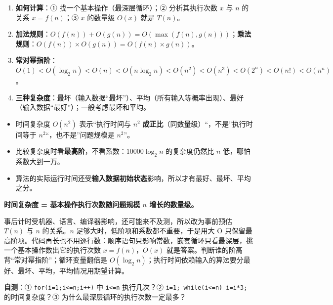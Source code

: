 \documentclass[10.5pt,a4paper,oneside]{article}
\providecommand{\tightlist}{\setlength{\itemsep}{2pt}\setlength{\parskip}{0pt}}
\begin{document}
\begin{exambox}

\begin{enumerate}
\def\labelenumi{\arabic{enumi}.}
\tightlist
\item
  \textbf{如何计算}：① 找一个基本操作（最深层循环）；② 分析其执行次数
  \(x\) 与 \(n\) 的关系 \(x=f(n)\)；③ \(x\) 的数量级 \(O(x)\) 就是
  \(T(n)\)。
\item
  \textbf{加法规则}：\(O(f(n))+O(g(n))=O(\max(f(n),g(n)))\)；\textbf{乘法规则}：\(O(f(n))\times O(g(n))=O(f(n)\times g(n))\)。
\item
  \textbf{常对幂指阶}：\(O(1)<O(\log_2 n)<O(n)<O(n\log_2 n)<O(n^2)<O(n^3)<O(2^n)<O(n!)<O(n^n)\)。
\item
  \textbf{三种复杂度}：最坏（输入数据“最坏”）、平均（所有输入等概率出现）、最好（输入数据“最好”）；一般考虑最坏和平均。
\end{enumerate}

\end{exambox}

\begin{pitfallbox}

\begin{itemize}
\tightlist
\item
  时间复杂度 \(O(n^2)\) 表示“执行时间与 \(n^2\)
  \textbf{成正比}（同数量级）“，不是”执行时间等于
  \(n^2\)“，也不是”问题规模是 \(n^2\)”。
\item
  比较复杂度时看\textbf{最高阶}，不看系数：\(10000\log_2 n\)
  的复杂度仍然比 \(n\) 低，哪怕系数大到一万。
\item
  算法的实际运行时间还受\textbf{输入数据初始状态}影响，所以才有最好、最坏、平均之分。
\end{itemize}

\end{pitfallbox}

\begin{summarybox}

\textbf{时间复杂度 = 基本操作执行次数随问题规模 \(n\) 增长的数量级。}

事后计时受机器、语言、编译器影响，还可能来不及测，所以改为事前预估
\(T(n)\) 与 \(n\) 的关系。\(n\) 足够大时，低阶项和系数都不重要，于是用大
O
只保留最高阶项。代码再长也不用逐行数：顺序语句只影响常数，嵌套循环只看最深层，挑一个基本操作数出它的执行次数
\(x=f(n)\)，\(O(x)\)
就是答案。判断谁的阶高背“常对幂指阶”；循环变量翻倍是
\(O(\log_2 n)\)；执行时间依赖输入的算法要分最好、最坏、平均，平均情况用期望计算。

\textbf{自测}：① \texttt{for(i=1;i\textless{}=n;i++)} 中
\texttt{i\textless{}=n} 执行几次？②
\texttt{i=1;\ while(i\textless{}=n)\ i=i*3;} 的时间复杂度？③
为什么最深层循环的执行次数一定最多？

\end{summarybox}
\end{document}
